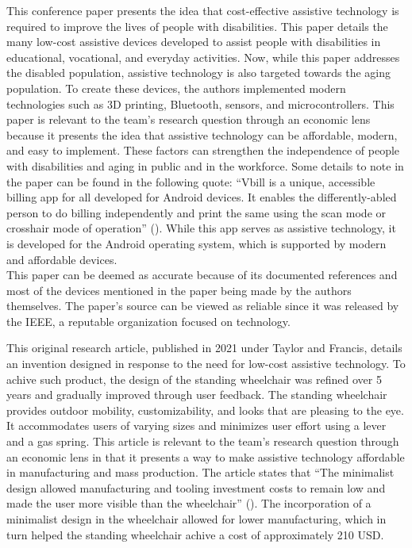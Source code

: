 \pagebreak
{}

This conference paper presents the idea that cost-effective assistive technology is required to improve the lives of people with disabilities. This paper
          details the many low-cost assistive devices developed to assist people with disabilities in educational, vocational, and everyday activities.
          Now, while this paper addresses the disabled population, assistive technology is also targeted towards the aging population.
          To create these devices, the authors implemented modern technologies such as 3D printing, Bluetooth, sensors, and microcontrollers. This paper is
          relevant to the team's research question through an economic lens because it presents the idea that assistive technology can be affordable, modern,
          and easy to implement. These factors can strengthen the independence of people with disabilities and aging in public and in the workforce.
          Some details to note in the paper can be found in the following quote: ``Vbill is a unique, accessible billing app for all developed for Android devices. It enables the differently-abled person to do billing independently and print the same using the scan mode or crosshair mode of operation'' (\cite{8929591}).
          While this app serves as assistive technology, it is developed for the Android operating system, which is supported by modern and affordable devices.
          \\This paper can be deemed as accurate because of its documented references and most of the devices mentioned in the paper being made by the authors themselves.
          The paper's source can be viewed as reliable since it was released by the IEEE, a reputable organization focused on technology.
          
\pagebreak
          

This original research article, published in 2021 under Taylor and Francis, details an invention designed in response to the need for low-cost assistive technology.
          To achive such product, the design of the standing wheelchair was refined over 5 years and gradually improved through user feedback. The standing wheelchair provides outdoor mobility, customizability, and looks that are pleasing to the eye. It accommodates users of varying
          sizes and minimizes user effort using a lever and a gas spring. This article is relevant to the team's research question through an economic lens
          in that it presents a way to make assistive technology affordable in manufacturing and mass production. The article states that
          ``The minimalist design allowed manufacturing and tooling investment costs to remain low and made the user more visible than the wheelchair'' (\cite{doi:10.1080/17483107.2021.1892839}).
          The incorporation of a minimalist design in the wheelchair allowed for lower manufacturing, which in turn helped
          the standing wheelchair achive a cost of approximately 210 USD.\@



